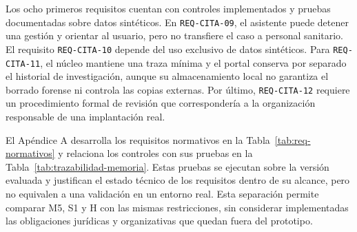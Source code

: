 Los ocho primeros requisitos cuentan con controles implementados y pruebas documentadas sobre datos sintéticos. En \texttt{REQ-CITA-09}, el asistente puede detener una gestión y orientar al usuario, pero no transfiere el caso a personal sanitario. El requisito \texttt{REQ-CITA-10} depende del uso exclusivo de datos sintéticos. Para \texttt{REQ-CITA-11}, el núcleo mantiene una traza mínima y el portal conserva por separado el historial de investigación, aunque su almacenamiento local no garantiza el borrado forense ni controla las copias externas. Por último, \texttt{REQ-CITA-12} requiere un procedimiento formal de revisión que correspondería a la organización responsable de una implantación real.

\enlargethispage{\baselineskip}%
El Apéndice A desarrolla los requisitos normativos en la Tabla~\ref{tab:req-normativos} y relaciona los controles con sus pruebas en la Tabla~\ref{tab:trazabilidad-memoria}. Estas pruebas se ejecutan sobre la versión evaluada y justifican el estado técnico de los requisitos dentro de su alcance, pero no equivalen a una validación en un entorno real. Esta separación permite comparar M5, S1 y H con las mismas restricciones, sin considerar implementadas las obligaciones jurídicas y organizativas que quedan fuera del prototipo.
